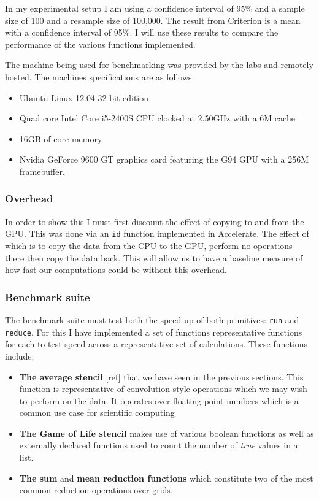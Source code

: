 In my experimental setup I am using a confidence interval of 95\% and a
sample size of 100 and a resample size of 100,000. The result from
Criterion is a mean with a confidence interval of 95\%. I will use these
results to compare the performance of the various functions implemented.

The machine being used for benchmarking was provided by the labs and
remotely hosted. The machines specifications are as follows:

\begin{itemize}
\itemsep1pt\parskip0pt
\item
  Ubuntu Linux 12.04 32-bit edition
\item
  Quad core Intel Core i5-2400S CPU clocked at 2.50GHz with a 6M cache
\item
  16GB of core memory
\item
  Nvidia GeForce 9600 GT graphics card featuring the G94 GPU with a 256M
  framebuffer.
\end{itemize}

\subsubsection{Overhead}

In order to show this I must first discount the effect of copying to and
from the GPU. This was done via an \texttt{id} function implemented in
Accelerate. The effect of which is to copy the data from the CPU to the
GPU, perform no operations there then copy the data back. This will
allow us to have a baseline measure of how fast our computations could
be without this overhead.

\subsubsection{Benchmark suite}

The benchmark suite must test both the speed-up of both primitives:
\texttt{run} and \texttt{reduce}. For this I have implemented a set of
functions representative functions for each to test speed across a
representative set of calculations. These functions include:

\begin{itemize}
\itemsep1pt\parskip0pt
\item
  \textbf{The average stencil} {[}ref{]} that we have seen in the
  previous sections. This function is representative of convolution
  style operations which we may wish to perform on the data. It operates
  over floating point numbers which is a common use case for scientific
  computing
\item
  \textbf{The Game of Life stencil} makes use of various boolean
  functions as well as externally declared functions used to count the
  number of \emph{true} values in a list.
\item
  \textbf{The sum} and \textbf{mean reduction functions} which
  constitute two of the most common reduction operations over grids.
\end{itemize}

